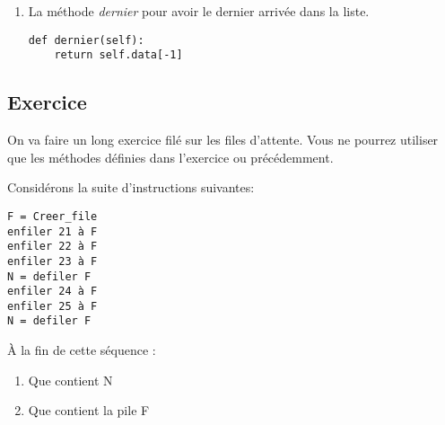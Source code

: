 \documentclass[12pt,fleqn]{article} %
\begin{document}
\begin{enumerate}
	\begin{center}
		\begin{varwidth}[t]{.5\textwidth}
			\begin{lstlisting}[language=iPython,linewidth = 15cm]
def defiler(self):
	return self.data.pop(0)\end{lstlisting}
	\end{varwidth}\end{center} 
	\item La méthode \textit{dernier} pour avoir le dernier arrivée dans la liste.
		\begin{center}
		\begin{varwidth}[t]{.5\textwidth}
			\begin{lstlisting}[language=iPython,linewidth = 15cm]
def dernier(self):
	return self.data[-1]\end{lstlisting}\end{varwidth}\end{center} 
	
\end{enumerate}


\subsection{Exercice}
On va faire un long exercice filé sur les files d'attente. Vous ne pourrez utiliser que les méthodes définies dans l'exercice ou précédemment.

\begin{exercise}
Considérons la suite d'instructions suivantes:

\begin{center}
	\begin{varwidth}[t]{.5\textwidth}
		\begin{lstlisting}[language=Pseudo,linewidth = 6cm]
F = Creer_file
enfiler 21 à F
enfiler 22 à F
enfiler 23 à F
N = defiler F
enfiler 24 à F
enfiler 25 à F
N = defiler F
\end{lstlisting}
\end{varwidth}\hspace{2cm}
\end{center}

\`A la fin de cette séquence : \begin{enumerate}
	\item Que contient N
	\item Que contient la pile F
\end{enumerate}
\end{exercise}
\end{document}
